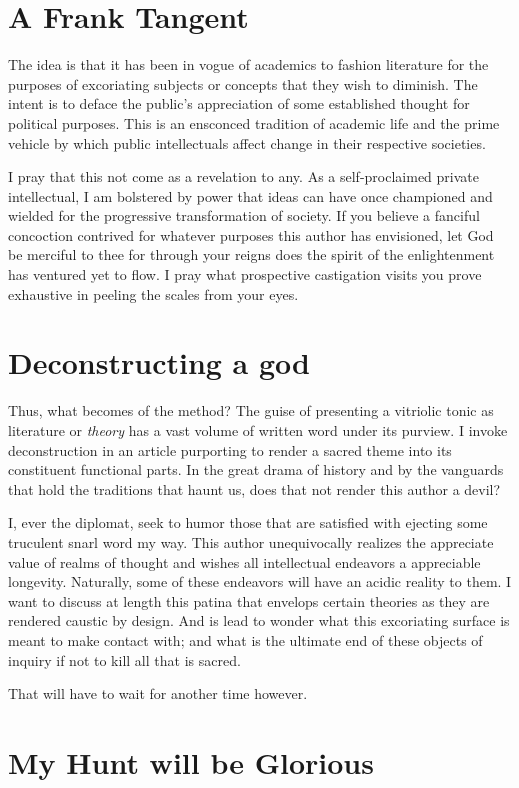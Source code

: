 \documentclass[ms,a4paper]{memoir}
\newcommand{\red}[1]{\textcolor{red!50!black}{#1}}
\begin{document}
	\section{\red{A Frank Tangent}}
	The idea is that it has been in vogue of academics to fashion literature for the purposes of excoriating subjects or concepts that they wish to diminish. The intent is to deface the public's appreciation of some established thought for political purposes. This is an ensconced tradition of academic life and the prime vehicle by which public intellectuals affect change in their respective societies.
	
	I pray that this not come as a revelation to any. As a self-proclaimed private intellectual, I am bolstered by power that ideas can have once championed and wielded for the progressive transformation of society. If you believe a fanciful concoction contrived for whatever purposes this author has envisioned, let God be merciful to thee for through your reigns does the spirit of the enlightenment has ventured yet to flow. I pray what prospective castigation visits you prove exhaustive in peeling the scales from your eyes.
	
	\section{Deconstructing a god}
	Thus, what becomes of the method? The guise of presenting a vitriolic tonic as literature or \textit{theory} has a vast volume of written word under its purview. I invoke deconstruction in an article purporting to render a sacred theme into its constituent functional parts. In the great drama of history and by the vanguards that hold the traditions that haunt us, does that not render this author a devil?
	
	I, ever the diplomat, seek to humor those that are satisfied with ejecting some truculent snarl word my way. This author unequivocally realizes the appreciate value of realms of thought and wishes all intellectual endeavors a appreciable longevity. Naturally, some of these endeavors will have an acidic reality to them. I want to discuss at length this patina that envelops certain theories as they are rendered caustic by design. And is lead to wonder what this excoriating surface is meant to make contact with; and what is the ultimate end of these objects of inquiry if not to kill all that is sacred.
	
	That will have to wait for another time however.
	
	\section{My Hunt will be Glorious}
	
\end{document}
